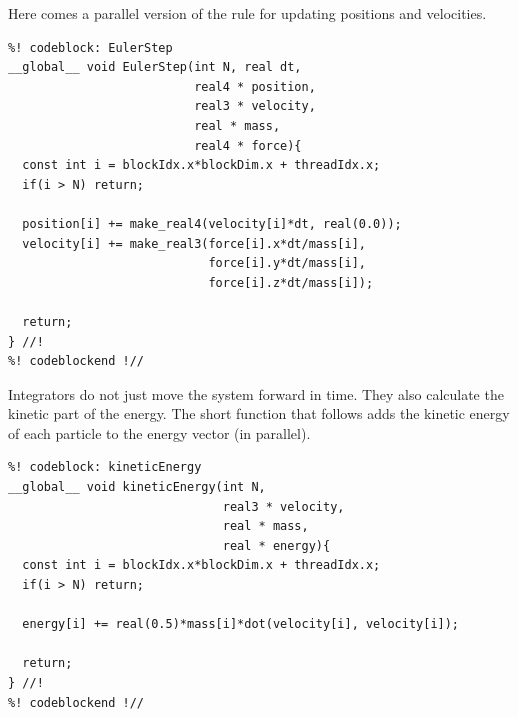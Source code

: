 Here comes a parallel version of the rule for updating positions and velocities.
\begin{lstlisting}
%! codeblock: EulerStep
__global__ void EulerStep(int N, real dt,
                          real4 * position,
                          real3 * velocity,
                          real * mass,
                          real4 * force){
  const int i = blockIdx.x*blockDim.x + threadIdx.x;
  if(i > N) return;

  position[i] += make_real4(velocity[i]*dt, real(0.0));
  velocity[i] += make_real3(force[i].x*dt/mass[i],
                            force[i].y*dt/mass[i],
                            force[i].z*dt/mass[i]);

  return;
} //!
%! codeblockend !//
\end{lstlisting}
Integrators do not just move the system forward in time. They also calculate the 
kinetic part of the energy. The short function that follows adds the kinetic 
energy of each particle to the energy vector (in parallel).
\begin{lstlisting}
%! codeblock: kineticEnergy
__global__ void kineticEnergy(int N,
                              real3 * velocity,
                              real * mass,
                              real * energy){
  const int i = blockIdx.x*blockDim.x + threadIdx.x;
  if(i > N) return;

  energy[i] += real(0.5)*mass[i]*dot(velocity[i], velocity[i]);

  return;
} //!
%! codeblockend !//
\end{lstlisting}

